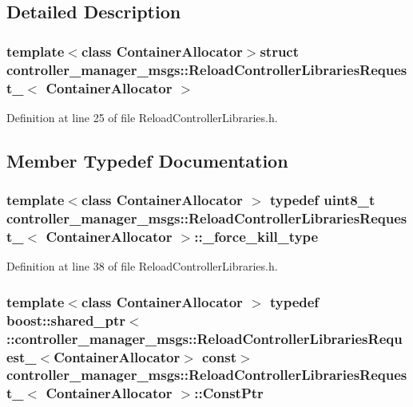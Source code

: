\subsection{\-Detailed \-Description}
\subsubsection*{template$<$class Container\-Allocator$>$struct controller\-\_\-manager\-\_\-msgs\-::\-Reload\-Controller\-Libraries\-Request\-\_\-$<$ Container\-Allocator $>$}



\-Definition at line 25 of file \-Reload\-Controller\-Libraries.\-h.



\subsection{\-Member \-Typedef \-Documentation}
\subsubsection[{\-\_\-force\-\_\-kill\-\_\-type}]{\setlength{\rightskip}{0pt plus 5cm}template$<$class Container\-Allocator $>$ typedef uint8\-\_\-t {\bf controller\-\_\-manager\-\_\-msgs\-::\-Reload\-Controller\-Libraries\-Request\-\_\-}$<$ \-Container\-Allocator $>$\-::{\bf \-\_\-force\-\_\-kill\-\_\-type}}\label{structcontroller__manager__msgs_1_1ReloadControllerLibrariesRequest___ac86fe27506325955d666120da3fe977b}


\-Definition at line 38 of file \-Reload\-Controller\-Libraries.\-h.

\subsubsection[{\-Const\-Ptr}]{\setlength{\rightskip}{0pt plus 5cm}template$<$class Container\-Allocator $>$ typedef boost\-::shared\-\_\-ptr$<$ \-::{\bf controller\-\_\-manager\-\_\-msgs\-::\-Reload\-Controller\-Libraries\-Request\-\_\-}$<$\-Container\-Allocator$>$ const$>$ {\bf controller\-\_\-manager\-\_\-msgs\-::\-Reload\-Controller\-Libraries\-Request\-\_\-}$<$ \-Container\-Allocator $>$\-::{\bf \-Const\-Ptr}}\label{structcontroller__manager__msgs_1_1ReloadControllerLibrariesRequest___a1f8ee6dbc1b287a53d54c7ddd70f881a}


